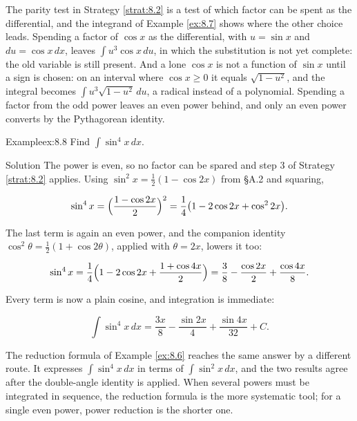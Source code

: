 \documentclass[a4paper,12pt,oneside]{memoir}
\begin{document}
The parity test in Strategy \ref{strat:8.2} is a test of which factor can be spent as the differential, and the integrand of Example \ref{ex:8.7} shows where the other choice leads. Spending a factor of \(\cos x\) as the differential, with \(u = \sin x\) and \(du = \cos x\,dx\), leaves \(\int u^{3}\cos x\,du\), in which the substitution is not yet complete: the old variable is still present. And a lone \(\cos x\) is not a function of \(\sin x\) until a sign is chosen: on an interval where \(\cos x \ge 0\) it equals \(\sqrt{1 - u^{2}}\), and the integral becomes \(\int u^{3}\sqrt{1 - u^{2}}\,du\), a radical instead of a polynomial. Spending a factor from the odd power leaves an even power behind, and only an even power converts by the Pythagorean identity.

\begin{workedexample}
\begin{envexample}{Example}{ex:8.8}{}
Find \(\displaystyle\int \sin^{4}x\,dx\).
\end{envexample}
\begin{envsolution}{Solution}{}{}
The power is even, so no factor can be spared and step 3 of Strategy \ref{strat:8.2} applies. Using \(\sin^{2}x = \tfrac{1}{2}(1 - \cos 2x)\) from §A.2 and squaring,

\[ \sin^{4}x = \Bigl(\frac{1 - \cos 2x}{2}\Bigr)^{2} = \frac{1}{4}\bigl(1 - 2\cos 2x + \cos^{2}2x\bigr). \]

The last term is again an even power, and the companion identity \(\cos^{2}\theta = \tfrac{1}{2}(1 + \cos 2\theta)\), applied with \(\theta = 2x\), lowers it too:

\[ \sin^{4}x = \frac{1}{4}\Bigl(1 - 2\cos 2x + \frac{1 + \cos 4x}{2}\Bigr) = \frac{3}{8} - \frac{\cos 2x}{2} + \frac{\cos 4x}{8}. \]

Every term is now a plain cosine, and integration is immediate:

\[ \int \sin^{4}x\,dx = \frac{3x}{8} - \frac{\sin 2x}{4} + \frac{\sin 4x}{32} + C. \]

The reduction formula of Example \ref{ex:8.6} reaches the same answer by a different route. It expresses \(\int\sin^{4}x\,dx\) in terms of \(\int\sin^{2}x\,dx\), and the two results agree after the double-angle identity is applied. When several powers must be integrated in sequence, the reduction formula is the more systematic tool; for a single even power, power reduction is the shorter one. \qedmark
\end{envsolution}
\end{workedexample}
\end{document}
